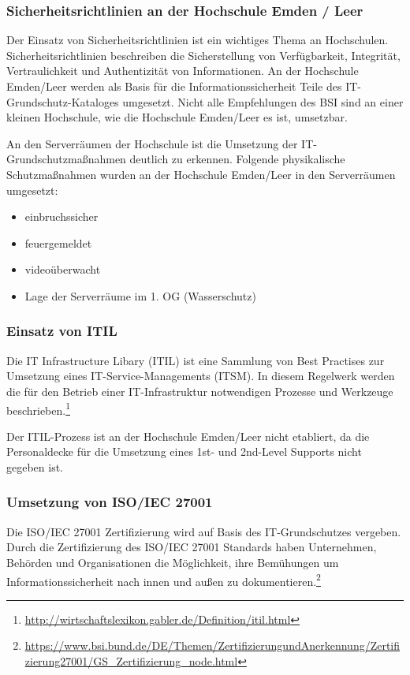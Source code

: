 \subsubsection{Sicherheitsrichtlinien an der Hochschule Emden / Leer}
Der Einsatz von Sicherheitsrichtlinien ist ein wichtiges Thema an Hochschulen. Sicherheitsrichtlinien beschreiben die Sicherstellung von Verfügbarkeit, Integrität, Vertraulichkeit und Authentizität von Informationen.
An der Hochschule Emden/Leer werden als Basis für die Informationssicherheit Teile des IT-Grundschutz-Kataloges umgesetzt. Nicht alle Empfehlungen des BSI sind an einer kleinen Hochschule, wie die Hochschule Emden/Leer es ist,  umsetzbar.

An den Serverräumen der Hochschule ist die Umsetzung der IT-Grundschutzmaßnahmen deutlich zu erkennen.
Folgende physikalische Schutzmaßnahmen wurden an der Hochschule Emden/Leer in den Serverräumen umgesetzt:

\begin{itemize}
	\item einbruchssicher
	\item feuergemeldet
	\item videoüberwacht
	\item Lage der Serverräume im 1. OG (Wasserschutz)
\end{itemize}

\subsubsection{Einsatz von ITIL}
Die IT Infrastructure Libary (ITIL) ist eine Sammlung von Best Practises zur Umsetzung eines IT-Service-Managements (ITSM). In diesem Regelwerk werden die für den Betrieb einer IT-Infrastruktur notwendigen Prozesse und Werkzeuge beschrieben.\footnote{\url{http://wirtschaftslexikon.gabler.de/Definition/itil.html}}

Der ITIL-Prozess ist an der Hochschule Emden/Leer nicht etabliert, da die Personaldecke für die Umsetzung eines 1st- und 2nd-Level Supports nicht gegeben ist.

\subsubsection{Umsetzung von ISO/IEC 27001}
Die ISO/IEC 27001 Zertifizierung wird auf Basis des IT-Grundschutzes vergeben. Durch die Zertifizierung des ISO/IEC 27001 Standards haben Unternehmen, Behörden und Organisationen die Möglichkeit, ihre Bemühungen um Informationssicherheit nach innen und außen zu dokumentieren.\footnote{\url{https://www.bsi.bund.de/DE/Themen/ZertifizierungundAnerkennung/Zertifizierung27001/GS_Zertifizierung_node.html}}

